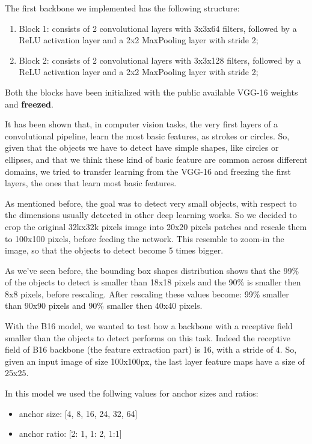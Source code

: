 \documentclass[a4paper,10pt]{report}
\begin{document}
The first backbone we implemented has the following structure:
\begin{enumerate}
  \item Block 1: consists of 2 convolutional layers with 3x3x64 filters, followed by a ReLU activation layer and a 2x2 MaxPooling layer with stride 2;
  \item Block 2: consists of 2 convolutional layers with 3x3x128 filters, followed by a ReLU activation layer and a 2x2 MaxPooling layer with stride 2;
\end{enumerate}
Both the blocks have been initialized with the public available VGG-16 weights and \textbf{freezed}.

It has been shown that, in computer vision tasks, the very first layers of a convolutional pipeline, learn the most basic features, as strokes or circles.
So, given that the objects we have to detect have simple shapes, like circles or ellipses, and that we think these kind of basic feature are common across different domains, 
we tried to transfer learning from the VGG-16 and freezing the first layers, the ones that learn most basic features.

As mentioned before, the goal was to detect very small objects, with respect to the dimensions usually detected in other deep learning works.
So we decided to crop the original 32kx32k pixels image into 20x20 pixels patches and rescale them to 100x100 pixels, before feeding the network.
This resemble to zoom-in the image, so that the objects to detect become 5 times bigger.

As we've seen before, the bounding box shapes distribution shows that the 99\% of the objects to detect is smaller than 18x18 pixels and the 90\% is smaller then 8x8 pixels, before rescaling.
After rescaling these values become: 99\% smaller than 90x90 pixels and 90\% smaller then 40x40 pixels.

With the B16 model, we wanted to test how a backbone with a receptive field smaller than the objects to detect performs on this task.
Indeed the receptive field of B16 backbone (the feature extraction part) is 16, with a stride of 4. So, given an input image of size 100x100px, the last layer feature maps have a size of 25x25.

In this model we used the follwing values for anchor sizes and ratios:
\begin{itemize}
  \item anchor size: [4, 8, 16, 24, 32, 64]
  \item anchor ratio: [2: 1, 1: 2, 1:1]
\end{itemize}
\end{document}
